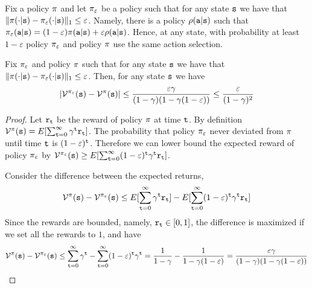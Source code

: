 Fix a policy $\pi$ and let $\pi_\varepsilon$ be a policy
such that for any state ${\tt s}$ we have that
$\|\pi(\cdot|{\tt s})-\pi_\varepsilon(\cdot|{\tt s})\|_1\leq\varepsilon$.
Namely, there is a policy $\rho({\tt a}|{\tt s})$ such that
$\pi_\varepsilon({\tt a}|{\tt s})=(1-\varepsilon)\pi({\tt a}|{\tt s})+\varepsilon
\rho({\tt a}|{\tt s})$. Hence, at any state, with probability at
least $1-\varepsilon$ policy $\pi_\varepsilon$ and policy
$\pi$ use the same action selection.

\begin{lemma}
\label{lemma:epsilon-greedy}
%
Fix $\pi_\varepsilon$ and policy $\pi$ such that for any
state ${\tt s}$ we have that
$\|\pi(\cdot|{\tt s})-\pi_\varepsilon(\cdot|{\tt s})\|_1\leq\varepsilon$.
Then, for any state ${\tt s}$ we have
\[
|\mathcal{V}^{\pi_\varepsilon}({\tt s})-\mathcal{V}^\pi({\tt s})|\leq
\frac{\varepsilon\gamma}{(1-\gamma)(1-\gamma(1-\varepsilon))}\leq \frac{\varepsilon}{(1-\gamma)^2}
\]
\end{lemma}

\begin{proof}
Let ${\tt r}_{\tt t}$ be the reward of policy $\pi$ at time
${\tt t}$. By definition
$\mathcal{V}^\pi({\tt s})=E[\sum_{{\tt t}=0}^\infty
\gamma^{\tt t}{\tt r}_{\tt t}]$. The probability that policy
$\pi_\varepsilon$ never deviated from $\pi$ until time ${\tt t}$
is $(1-\varepsilon)^{\tt t}$. Therefore we can lower bound the
expected reward of policy $\pi_\varepsilon$ by
$\mathcal{V}^{\pi_\varepsilon}({\tt s})\geq E[\sum_{{\tt t}=0}^\infty
(1-\varepsilon)^{\tt t}\gamma^{\tt t}{\tt r}_{\tt t}]$.

Consider the difference between the expected returns,
\[
\mathcal{V}^\pi({\tt s})- \mathcal{V}^{\pi_\varepsilon}({\tt s}) \leq
E[\sum_{{\tt t}=0}^\infty \gamma^{\tt t}{\tt r}_{\tt t}] -
E[\sum_{{\tt t}=0}^\infty
(1-\varepsilon)^{\tt t}\gamma^{\tt t}{\tt r}_{\tt t}]
\]
Since the rewards are bounded, namely, ${\tt r}_{\tt t}\in[0,1]$, the
difference is maximized if we set all the rewards to $1$, and have
\[
\mathcal{V}^\pi({\tt s})- \mathcal{V}^{\pi_\varepsilon}({\tt s}) \leq
\sum_{{\tt t}=0}^\infty \gamma^{\tt t} - \sum_{{\tt t}=0}^\infty
(1-\varepsilon)^{\tt t}\gamma^{\tt t}=
\frac{1}{1-\gamma}-\frac{1}{1-\gamma(1-\varepsilon)}=\frac{\varepsilon\gamma}{(1-\gamma)(1-\gamma(1-\varepsilon))}
\]
\end{proof}

